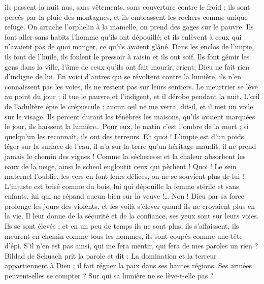 \begin{multicols}{2}
ils passent la nuit nus, sans vêtements, sans couverture contre le froid ;
ils sont percés par la pluie des montagnes, et ils embrassent les rochers comme unique refuge.
On arrache l'orphelin à la mamelle, on prend des gages sur le pauvre.
Ils font aller sans habits l'homme qu'ils ont dépouillé; et ils enlèvent à ceux qui n'avaient pas de quoi manger, ce qu'ils avaient glâné.
Dans les enclos de l'impie, ils font de l'huile, ils foulent le pressoir à raisin et ils ont soif.
Ils font gémir les gens dans la ville, l'âme de ceux qu'ils ont fait mourir, crient; Dieu ne fait rien d'indigne de lui.
En voici d'autres qui se révoltent contre la lumière, ils n'en connaissent pas les voies, ils ne restent pas sur leurs sentiers.
Le meurtrier se lève au point du jour ; il tue le pauvre et l'indigent, et il dérobe pendant la nuit.
L'œil de l'adultère épie le crépuscule ; aucun œil ne me verra, dit-il, et il met un voile sur le visage.
Ils percent durant les ténèbres les maisons, qu'ils avaient marquées le jour, ils haïssent la lumière..
Pour eux, le matin c'est l'ombre de la mort ; si quelqu'un les reconnaît, ils ont des terreurs.
Eh quoi ! L'impie est d'un poids léger sur la surface de l'eau, il n'a sur la terre qu'un héritage maudit, il ne prend jamais le chemin des vignes !
Comme la sécheresse et la chaleur absorbent les eaux de la neige, ainsi le scheol engloutit ceux qui pèchent !
Quoi ! Le sein maternel l'oublie, les vers en font leurs délices, on ne se souvient plus de lui ! L'injuste est brisé comme du bois,
lui qui dépouille la femme stérile et sans enfants, lui qui ne répand aucun bien sur la veuve !…
Non ! Dieu par sa force prolonge les jours des violents, et les voilà s'élever quand ils ne croyaient plus en la vie.
Il leur donne de la sécurité et de la confiance, ses yeux sont sur leurs voies.
Ils se sont élevés ; et en un peu de temps ils ne sont plus, ils s'affaissent, ils meurent en chemin comme tous les hommes, ils sont coupés comme une tête d'épi.
S'il n'en est pas ainsi, qui me fera mentir, qui fera de mes paroles un rien ?
\VerseOne{}Bildad de Schuach prit la parole et dit :
La domination et la terreur appartiennent à Dieu ; il fait régner la paix dans ses hautes régions.
Ses armées peuvent-elles se compter ? Sur qui sa lumière ne se lève-t-elle pas ?

\end{multicols}
